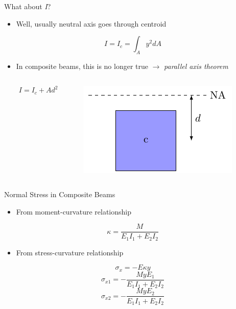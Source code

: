 \documentclass[10pt, svgnames]{beamer}
\begin{document}
\begin{frame}[label={sec:orgee20990}]{What about \emph{I}?}
\begin{itemize}
\item Well, usually neutral axis goes through centroid
\end{itemize}

\[I = I_c = \int_A y^2 dA\]

\begin{itemize}
\item In composite beams, this is no longer true \(\rightarrow\) \emph{parallel
axis theorem}
\end{itemize}

\begin{columns}
\begin{column}{0.5\columnwidth}
\[I = I_c + Ad^2\]
\end{column}

\begin{column}{0.5\columnwidth}
\begin{center}
\includegraphics[width=.9\linewidth]{./pictures/parallel-axis.pdf}
\end{center}
\end{column}
\end{columns}
\end{frame}

\begin{frame}[label={sec:orged30964}]{Normal Stress in Composite Beams}
\begin{itemize}
\item From moment-curvature relationship
\end{itemize}

\[\kappa = \frac{M}{E_1 I_1 + E_2 I_2}\]

\begin{itemize}
\item From stress-curvature relationship
\end{itemize}

\[\sigma_x = - E \kappa y\]
\[\sigma_{x1} = - \frac{MyE_1}{E_1 I_1 + E_2 I_2}\]
\[\sigma_{x2} = - \frac{MyE_2}{E_1 I_1 + E_2 I_2}\]
\end{frame}
\end{document}
